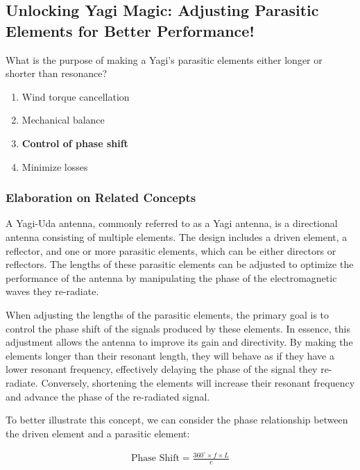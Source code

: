 \subsection{Unlocking Yagi Magic: Adjusting Parasitic Elements for Better Performance!}

\begin{tcolorbox}[colback=gray!10, colframe=black, title=E9D12] What is the purpose of making a Yagi’s parasitic elements either longer or shorter than resonance?
\begin{enumerate}[label=\Alph*.]
    \item Wind torque cancellation
    \item Mechanical balance
    \item \textbf{Control of phase shift}
    \item Minimize losses
\end{enumerate} \end{tcolorbox}

\subsubsection{Elaboration on Related Concepts}

A Yagi-Uda antenna, commonly referred to as a Yagi antenna, is a directional antenna consisting of multiple elements. The design includes a driven element, a reflector, and one or more parasitic elements, which can be either directors or reflectors. The lengths of these parasitic elements can be adjusted to optimize the performance of the antenna by manipulating the phase of the electromagnetic waves they re-radiate.

When adjusting the lengths of the parasitic elements, the primary goal is to control the phase shift of the signals produced by these elements. In essence, this adjustment allows the antenna to improve its gain and directivity. By making the elements longer than their resonant length, they will behave as if they have a lower resonant frequency, effectively delaying the phase of the signal they re-radiate. Conversely, shortening the elements will increase their resonant frequency and advance the phase of the re-radiated signal.

To better illustrate this concept, we can consider the phase relationship between the driven element and a parasitic element:

\begin{align*}
\text{Phase Shift} = \frac{360^\circ \times f \times L}{c} 
\end{align*}

